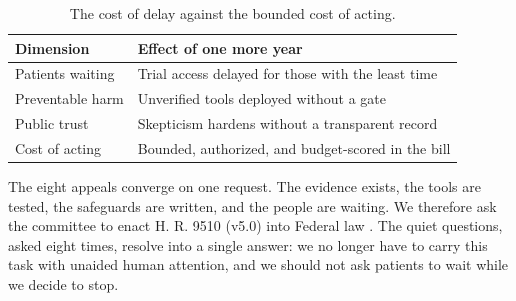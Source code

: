 \begin{table}[H]
\footnotesize
\begin{tabularx}{\textwidth}{@{}L{4.4cm} Y@{}}
\toprule
\textbf{Dimension} & \textbf{Effect of one more year}\\
\midrule
Patients waiting & Trial access delayed for those with the least time\\
Preventable harm & Unverified tools deployed without a gate\\
Public trust & Skepticism hardens without a transparent record\\
Cost of acting & Bounded, authorized, and budget-scored in the bill\\
\bottomrule
\end{tabularx}
\caption{The cost of delay against the bounded cost of acting.}
\label{tab:urgency}
\end{table}

The eight appeals converge on one request. The evidence exists, the tools are
tested, the safeguards are written, and the people are waiting. We therefore ask
the committee to enact H. R. 9510 (v5.0) into Federal law
\cite{Kawchak2026HR9510Bill}. The quiet questions, asked eight times, resolve into
a single answer: we no longer have to carry this task with unaided human attention,
and we should not ask patients to wait while we decide to stop.
